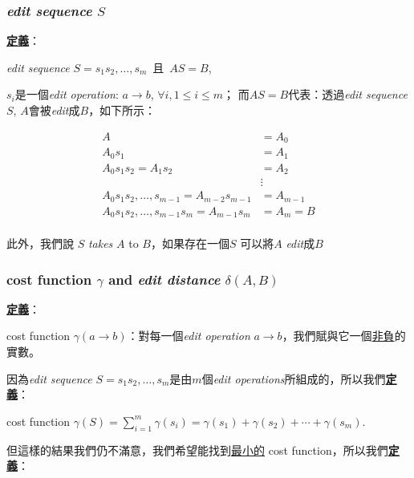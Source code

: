 \documentclass[15pt]{extarticle}
\begin{document}
\subsubsection{\textit{edit sequence} $S$}

\textbf{\uline{定義}}：

\begin{center}
\textit{edit sequence} $S=s_1s_2,\dots,s_m$\mbox{ 且 }$AS = B$,
\end{center}

$s_i$是一個\textit{edit operation}: $a\to b$, $\forall i, 1\le i\le m$；
而$AS=B$代表：透過\textit{edit sequence} $S$, $A$會被\textit{edit}成$B$，如下所示：

\begin{align*}
    A &= A_0 \\
    A_0s_1 &= A_1 \\
    A_0s_1s_2=A_1s_2 &= A_2 \\
    &\vdots \\
    A_0s_1s_2,\dots,s_{m-1}=A_{m-2}s_{m-1}&= A_{m-1} \\
    A_0s_1s_2,\dots,s_{m-1}s_m=A_{m-1}s_m &= A_m=B \\
\end{align*}

此外，我們說 $S$ \textit{takes} $A$ to $B$，如果存在一個$S$ 可以將$A$ \textit{edit}成$B$

\subsubsection{cost function $\gamma$ and \textit{edit distance} $\delta(A,B)$} 

\textbf{\uline{定義}}：

\begin{center}
cost function $\gamma(a\to b)$：對每一個\textit{edit operation} $a\to b$，我們賦與它一個\uline{非負}的實數。 
\end{center}

因為\textit{edit sequence} $S=s_1s_2,\dots,s_m$是由$m$個\textit{edit operations}所組成的，所以我們\textbf{\uline{定義}}：

\begin{center}
cost function $\gamma(S)=\sum_{i=1}^m\gamma(s_i)=\gamma(s_1)+\gamma(s_2)+\cdots+\gamma(s_m).$
\end{center}

但這樣的結果我們仍不滿意，我們希望能找到\uline{最小的} cost function，所以我們\textbf{\uline{定義}}：
\end{document}
